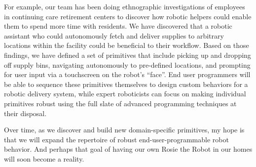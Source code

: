 \documentclass[11pt,twocolumn]{article}
\begin{document}
For example, our team has been doing ethnographic investigations of employees in continuing care retirement centers to discover how robotic helpers could enable them to spend more time with residents. We have discovered that a robotic assistant who could autonomously fetch and deliver supplies to arbitrary locations within the facility could be beneficial to their workflow. Based on those findings, we have defined a set of primitives that include picking up and dropping off supply bins, navigating autonomously to pre-defined locations, and prompting for user input via a touchscreen on the robot's ``face''. End user programmers will be able to sequence these primitives themselves to design custom behaviors for a robotic delivery system, while expert roboticists can focus on making individual primitives robust using the full slate of advanced programming techniques at their disposal.

Over time, as we discover and build new domain-specific primitives, my hope is that we will expand the repertoire of robust end-user-programmable robot behavior. And perhaps that goal of having our own Rosie the Robot in our homes will soon become a reality.
\end{document}
